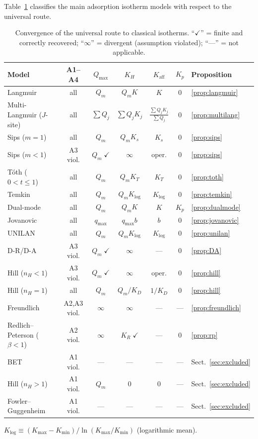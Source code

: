 \documentclass[12pt]{article}
\begin{document}
Table~\ref{tab:summary} classifies the main adsorption isotherm
models with respect to the universal route.

\begin{table}[htbp]
\centering
\caption{Convergence of the universal route to classical isotherms.
``$\checkmark$'' = finite and correctly recovered;
``$\infty$'' = divergent (assumption violated);
``---'' = not applicable.}
\label{tab:summary}
\small
\begin{tabular}{@{}lcccccl@{}}
\toprule
\textbf{Model} & \textbf{A1--A4} & $Q_{\max}$ & $K_H$
  & $K_{\mathrm{aff}}$ & $K_p$ & \textbf{Proposition} \\
\midrule
Langmuir
  & all & $Q_m$ & $Q_m K$ & $K$
  & $0$ & \ref{prop:langmuir} \\[2pt]
Multi-Langmuir ($J$-site)
  & all & $\sum Q_j$ & $\sum Q_j K_j$
  & $\frac{\sum Q_j K_j}{\sum Q_j}$
  & $0$ & \ref{prop:multilang} \\[2pt]
Sips ($m=1$)
  & all & $Q_m$ & $Q_m K_s$ & $K_s$
  & $0$ & \ref{prop:sips} \\[2pt]
Sips ($m<1$)
  & A3 viol. & $Q_m\;\checkmark$ & $\infty$
  & oper. & $0$ & \ref{prop:sips} \\[2pt]
T\'oth ($0<t\le 1$)
  & all & $Q_m$ & $Q_m K_T$ & $K_T$
  & $0$ & \ref{prop:toth} \\[2pt]
Temkin
  & all & $Q_m$ & $Q_m K_{\log}$
  & $K_{\log}$ & $0$ & \ref{prop:temkin} \\[2pt]
Dual-mode
  & all & $Q_m$ & $Q_m K$ & $K$
  & $K_p$ & \ref{prop:dualmode} \\[2pt]
Jovanovic
  & all & $q_{\max}$ & $q_{\max}b$ & $b$
  & $0$ & \ref{prop:jovanovic} \\[2pt]
UNILAN
  & all & $Q_m$ & $Q_m K_{\log}$
  & $K_{\log}$ & $0$ & \ref{prop:unilan} \\[2pt]
D-R/D-A
  & A3 viol. & $Q_m\;\checkmark$ & $\infty$
  & --- & $0$ & \ref{prop:DA} \\[2pt]
Hill ($n_H<1$)
  & A3 viol. & $Q_m\;\checkmark$ & $\infty$
  & oper. & $0$ & \ref{prop:hill} \\[2pt]
Hill ($n_H=1$)
  & all & $Q_m$ & $Q_m/K_D$ & $1/K_D$
  & $0$ & \ref{prop:hill} \\[2pt]
Freundlich
  & A2,A3 viol. & $\infty$ & $\infty$
  & --- & --- & \ref{prop:freundlich} \\[2pt]
Redlich--Peterson ($\beta<1$)
  & A2 viol. & $\infty$ & $K_R\;\checkmark$
  & --- & $0$ & \ref{prop:rp} \\[2pt]
\midrule
BET & A1 viol. & --- & --- & --- & ---
  & Sect.~\ref{sec:excluded} \\
Hill ($n_H>1$)
  & A1 viol. & $Q_m$ & $0$ & $0$
  & --- & Sect.~\ref{sec:excluded} \\
Fowler--Guggenheim
  & A1 viol. & --- & --- & --- & ---
  & Sect.~\ref{sec:excluded} \\
\bottomrule
\end{tabular}

\medskip
$K_{\log}\equiv(K_{\max}-K_{\min})/\ln(K_{\max}/K_{\min})$
\quad (logarithmic mean).
\end{table}
\end{document}
